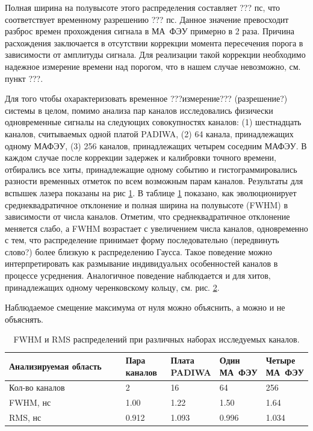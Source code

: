 Полная ширина на полувысоте этого распределения составляет ??? пс, что соответствует временному разрешению ??? пс. Данное значение превосходит разброс времен прохождения сигнала в МА~ФЭУ примерно в 2 раза. Причина расхождения заключается в отсутствии коррекции момента пересечения порога в зависимости от амплитуды сигнала. Для реализации такой коррекции необходимо надежное измерение времени над порогом, что в нашем случае невозможно, см. пункт ???.

Для того чтобы охарактеризовать временное ???измерение??? (разрешение?) системы в целом, помимо анализа пар каналов исследовались физически одновременные сигналы на следующих совокупностях каналов: (1) шестнадцать каналов, считываемых одной платой PADIWA, (2) 64 канала, принадлежащих одному МАФЭУ, (3) 256 каналов, принадлежащих четырем соседним МАФЭУ. В каждом случае после коррекции задержек и калибровки точного времени, отбирались все хиты, принадлежащие одному событию и гистограммировались разности временных отметок по всем возможным парам каналов. Результаты для вспышек лазера показаны на рис \ref{fig:TimeResEvolutionLaser}. В таблице \ref{tabl:EvolutionParams} показано, как эволюционирует среднеквадратичное отклонение и полная ширина на полувысоте (FWHM) в зависимости от числа каналов. Отметим, что среднеквадратичное отклонение меняется слабо, а FWHM возрастает с увеличением числа каналов, одновременно с тем, что распределение принимает форму последовательно (передвинуть слово?) более близкую к распределению Гаусса. Такое поведение можно интерпретировать как размывание индивидуальнх особенностей каналов в процессе усреднения. Аналогичное поведение наблюдается и для хитов, принадлежащих одному черенковскому кольцу, см. рис. \ref{fig:TimeResEvolutionRings}.

Наблюдаемое смещение максимума от нуля можно объяснить, а можно и не объяснять.

\begin{figure}
\label{fig:TimeResEvolutionLaser}
\end{figure}

\begin{figure}
\label{fig:TimeResEvolutionRings}
\end{figure}

\begin{table}[h]
\caption{FWHM и RMS распределений при различных наборах исследуемых каналов.}
\label{tabl:EvolutionParams}
\begin{tabular}{ | p{0.4\linewidth} | p{0.15\linewidth} | p{0.15\linewidth} | p{0.15\linewidth} | p{0.15\linewidth} | }
	\hline
	Анализируемая область & Пара каналов & Плата PADIWA & Один МА~ФЭУ & Четыре МА~ФЭУ \\
	\hline
	Кол-во каналов & 2 & 16 & 64 & 256 \\
	\hline
	FWHM, нс & 1.00 & 1.22 & 1.50 & 1.64 \\
	\hline
	RMS, нс & 0.912 & 1.093 & 0.996 & 1.034 \\
	\hline
\end{tabular}
\end{table}
